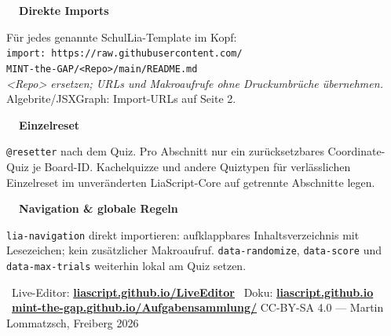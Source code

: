 \documentclass[a4paper,landscape,9pt]{extarticle}
\newcommand{\sheetfooter}{%
  \vfill
  {\sffamily\scriptsize\color{muted}
  \faInfoCircle~Live-Editor: \href{https://liascript.github.io/LiveEditor/}{\textbf{liascript.github.io/LiveEditor}}\hfill
  \faBook~Doku: \href{https://liascript.github.io}{\textbf{liascript.github.io}}\hfill
  \faGithub~\href{https://mint-the-gap.github.io/Aufgabensammlung/}{\textbf{mint-the-gap.github.io/Aufgabensammlung/}} \quad
  CC-BY-SA 4.0 — Martin Lommatzsch, Freiberg 2026}}
\begin{document}
\noindent\begin{tcolorbox}[
  enhanced, colback=extraorangeLt, colframe=extraorange!75,
  boxrule=0.3pt, arc=2pt, left=5pt,right=5pt,top=2pt,bottom=2pt,
  before skip=2pt,after skip=0pt
]
\scriptsize
\begin{minipage}[t]{0.33\linewidth}
\textbf{\color{extraorange}\faDownload~~Direkte Imports}\par
Für jedes genannte SchulLia-Template im Kopf:\\
\texttt{import: https://raw.githubusercontent.com/}\\
\texttt{MINT-the-GAP/<Repo>/main/README.md}\\
\textit{<Repo> ersetzen; URLs und Makroaufrufe ohne Druckumbrüche übernehmen.} Algebrite/JSXGraph: Import-URLs auf Seite 2.
\end{minipage}\hfill
\begin{minipage}[t]{0.32\linewidth}
\textbf{\color{extraorange}\faUndo~~Einzelreset}\par
\texttt{@resetter} nach dem Quiz. Pro Abschnitt nur ein zurücksetzbares Coordinate-Quiz je Board-ID. Kachelquizze und andere Quiztypen für verlässlichen Einzelreset im unveränderten LiaScript-Core auf getrennte Abschnitte legen.
\end{minipage}\hfill
\begin{minipage}[t]{0.32\linewidth}
\textbf{\color{extraorange}\faList~~Navigation \& globale Regeln}\par
\texttt{lia-navigation} direkt importieren: aufklappbares Inhaltsverzeichnis mit Lesezeichen; kein zusätzlicher Makroaufruf. \texttt{data-randomize}, \texttt{data-score} und \texttt{data-max-trials} weiterhin lokal am Quiz setzen.
\end{minipage}
\end{tcolorbox}
\sheetfooter
\end{document}
